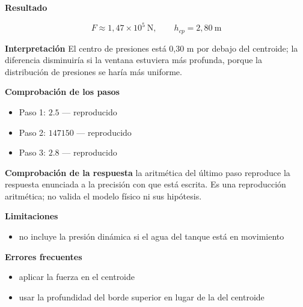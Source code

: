\documentclass[10pt,openany]{book}
\begin{document}
\begin{tcolorbox}[title={Problema resuelto}, studiumworked, breakable]
\noindent\textbf{Resultado}

\[
F \approx 1{,}47\times 10^{5}\ \mathrm{N},\qquad h_{cp} = 2{,}80\ \mathrm{m}
\]

\noindent\textbf{Interpretación}
El centro de presiones está 0,30 m por debajo del centroide; la diferencia disminuiría si la ventana estuviera más profunda, porque la distribución de presiones se haría más uniforme.

\noindent\textbf{Comprobación de los pasos}
\begin{itemize}
\item Paso 1: $2.5$ — reproducido
\item Paso 2: $147150$ — reproducido
\item Paso 3: $2.8$ — reproducido
\end{itemize}

\noindent\textbf{Comprobación de la respuesta} la aritmética del último paso reproduce la respuesta enunciada a la precisión con que está escrita. Es una reproducción aritmética; no valida el modelo físico ni sus hipótesis.

\noindent\textbf{Limitaciones}
\begin{itemize}
\item no incluye la presión dinámica si el agua del tanque está en movimiento
\end{itemize}

\noindent\textbf{Errores frecuentes}
\begin{itemize}
\item aplicar la fuerza en el centroide
\item usar la profundidad del borde superior en lugar de la del centroide
\end{itemize}
\end{tcolorbox}
\end{document}
